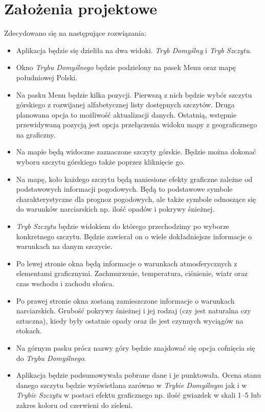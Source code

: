 \documentclass[10pt, a4paper]{article}
\begin{document}
\section{Założenia projektowe} 
	\begin{flushleft}
	Zdecydowano się na następujące rozwiązania:\\
	\end{flushleft}
	\begin{itemize}
		\item Aplikacja będzie się dzieliła na dwa widoki. \textit{Tryb Domyślny} i \textit{Tryb Szczytu}. 
		\item Okno \textit{Trybu Domyślnego} będzie podzielony na pasek Menu oraz mapę południowej Polski.
		\item Na pasku Menu będzie kilka pozycji. Pierwszą z nich będzie wybór szczytu górskiego z rozwijanej alfabetycznej listy dostępnych szczytów. Druga planowana opcja to możliwość aktualizacji danych. Ostatnią, wstępnie przewidywaną pozycją jest opcja przełączenia widoku mapy z geograficznego na graficzny.
		\item Na mapie będą widoczne zaznaczone szczyty górskie. Będzie można dokonać wyboru szczytu górskiego także poprzez kliknięcie go. 
		\item Na mapę, koło każdego szczytu będą naniesione efekty graficzne zależne od podstawowych informacji pogodowych. Będą to podstawowe symbole charakterystyczne dla prognoz pogodowych, ale także symbole odnoszące się do warunków narciarskich np. ilość opadów i pokrywy śnieżnej. 
		\item \textit{Tryb Szczytu} będzie widokiem do którego przechodzimy po wyborze konkretnego szczytu. Będzie zawierał on o wiele dokładniejsze informacje o warunkach na danym szczycie. 
		\item Po lewej stronie okna będą informacje o warunkach atmosferycznych z elementami graficznymi. Zachmurzenie, temperatura, ciśnienie, wiatr oraz czas wschodu i zachodu słońca. 
		\item Po prawej stronie okna zostaną zamieszczone informacje o warunkach narciarskich. Grubość pokrywy śnieżnej i jej rodzaj (czy jest naturalna czy sztuczna), kiedy były ostatnie opady oraz ile jest czynnych wyciągów na stokach.
		\item Na górnym pasku prócz nazwy góry będzie znajdować się opcja cofnięcia się do \textit{Trybu Domyślnego}.
		\item Aplikacja będzie podsumowywała pobrane dane i je punktowała. Ocena stanu danego szczytu będzie wyświetlana zarówno w \textit{Trybie Domyślnym} jak i w \textit{Trybie Szczytu} w postaci efektu graficznego np. ilość gwiazdek w skali 1--5 lub zakres koloru od czerwieni do zieleni.

\end{itemize}
\end{document}
